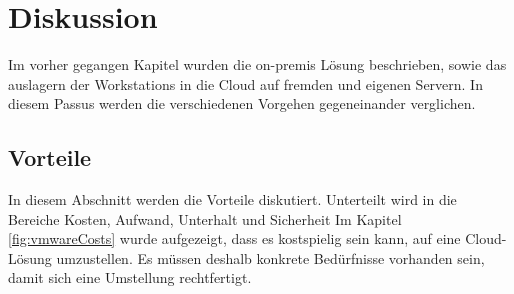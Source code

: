 
\chapter{Diskussion}
Im vorher gegangen Kapitel wurden die on-premis Lösung beschrieben, sowie das auslagern der Workstations in die Cloud auf fremden und eigenen Servern. In diesem Passus werden die verschiedenen Vorgehen gegeneinander verglichen.


\section{Vorteile}







In diesem Abschnitt werden die Vorteile diskutiert. Unterteilt wird in die Bereiche Kosten, Aufwand, Unterhalt und Sicherheit
Im Kapitel \ref{fig:vmwareCosts} wurde aufgezeigt, dass es kostspielig sein kann, auf eine Cloud-Lösung umzustellen. Es müssen deshalb konkrete Bedürfnisse vorhanden sein, damit sich eine Umstellung rechtfertigt.

